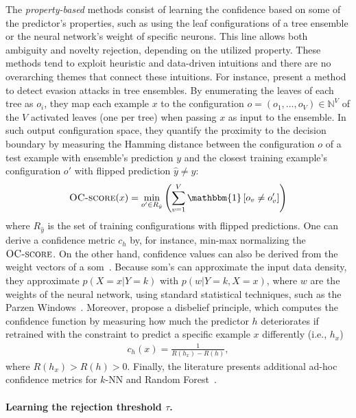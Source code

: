 The \emph{property-based} methods consist of learning the confidence based on some of the predictor's properties, such as using the leaf configurations of a tree ensemble or the neural network's weight of specific neurons. This line allows both ambiguity and novelty rejection, depending on the utilized property. These methods tend to exploit heuristic and data-driven intuitions and there are no overarching themes that connect these intuitions. 
For instance, \citet{Devos2023} present a method to detect evasion attacks in tree ensembles. By enumerating the leaves of each tree as $o_i$, they map each example $x$ to the configuration $o = (o_1,\dots,o_V) \in \mathbb{N}^V$ of the $V$ activated leaves (one per tree) when passing $x$ as input to the ensemble. In such output configuration space, they quantify the proximity to the decision boundary by measuring the Hamming distance between the configuration $o$ of a test example with ensemble's prediction $y$ and the closest training example's configuration $o'$ with flipped prediction $\hat{y} \ne y$:
\begin{equation*}
    \textsc{OC-score}(x) = \min_{o' \in R_{\hat{y}}} \left(\sum_{v=1}^V \mathbbm{1} \left[o_v \ne o'_v\right]\right)
\end{equation*}
where $R_{\hat{y}}$ is the set of training configurations with flipped predictions. One can derive a confidence metric $c_h$ by, for instance, min-max normalizing the $\textsc{OC-score}$.
On the other hand, confidence values can also be derived from the weight vectors of a \gls{som}~\citep{Sousa2014,GamelasSousa2015}. Because \gls{som}’s can approximate the input data density, they approximate $p(X=x|Y=k)$ with $p(w|Y=k,X=x)$, where $w$ are the weights of the neural network, using standard statistical techniques, such as the Parzen Windows~\citep{Vesanto1999}.
Moreover, \citet{El-Yaniv2011} propose a disbelief principle, which computes the confidence function by measuring how much the predictor $h$ deteriorates if retrained with the constraint to predict a specific example $x$ differently (i.e., $h_x$)
\begin{eqnarray*}
    c_h(x) = \frac{1}{R(h_x) - R(h)},
\end{eqnarray*}
where $R(h_x) > R(h) > 0$.
Finally, the literature presents additional ad-hoc confidence metrics for $k$-NN and Random Forest~\citep{Gopfert2018,Dalitz2009}.


\paragraph{\bf{Learning the rejection threshold $\tau$.}}

